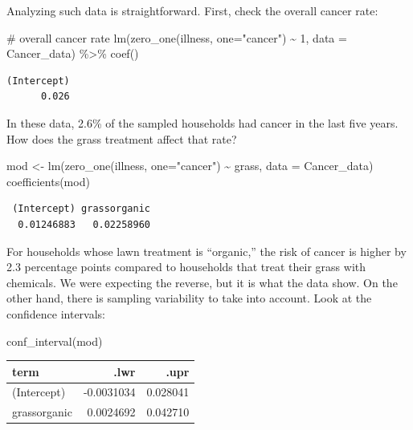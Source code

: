 \documentclass[
  letterpaper,
  DIV=11,
  numbers=noendperiod,
  oneside]{scrreprt}
\newenvironment{Shaded}{\begin{snugshade}}{\end{snugshade}}
\newcommand{\AttributeTok}[1]{\textcolor[rgb]{0.40,0.45,0.13}{#1}}
\newcommand{\CommentTok}[1]{\textcolor[rgb]{0.37,0.37,0.37}{#1}}
\newcommand{\DecValTok}[1]{\textcolor[rgb]{0.68,0.00,0.00}{#1}}
\newcommand{\FunctionTok}[1]{\textcolor[rgb]{0.28,0.35,0.67}{#1}}
\newcommand{\NormalTok}[1]{\textcolor[rgb]{0.00,0.23,0.31}{#1}}
\newcommand{\OtherTok}[1]{\textcolor[rgb]{0.00,0.23,0.31}{#1}}
\newcommand{\SpecialCharTok}[1]{\textcolor[rgb]{0.37,0.37,0.37}{#1}}
\newcommand{\StringTok}[1]{\textcolor[rgb]{0.13,0.47,0.30}{#1}}
\begin{document}
Analyzing such data is straightforward. First, check the overall cancer
rate:

\begin{Shaded}
\begin{Highlighting}[]
\CommentTok{\# overall cancer rate}
\FunctionTok{lm}\NormalTok{(}\FunctionTok{zero\_one}\NormalTok{(illness, }\AttributeTok{one=}\StringTok{"cancer"}\NormalTok{) }\SpecialCharTok{\textasciitilde{}} \DecValTok{1}\NormalTok{, }\AttributeTok{data =}\NormalTok{ Cancer\_data) }\SpecialCharTok{\%\textgreater{}\%} \FunctionTok{coef}\NormalTok{()}
\end{Highlighting}
\end{Shaded}

\begin{verbatim}
(Intercept) 
      0.026 
\end{verbatim}

In these data, 2.6\% of the sampled households had cancer in the last
five years. How does the grass treatment affect that rate?

\begin{Shaded}
\begin{Highlighting}[]
\NormalTok{mod }\OtherTok{\textless{}{-}} \FunctionTok{lm}\NormalTok{(}\FunctionTok{zero\_one}\NormalTok{(illness, }\AttributeTok{one=}\StringTok{"cancer"}\NormalTok{) }\SpecialCharTok{\textasciitilde{}}\NormalTok{ grass, }\AttributeTok{data =}\NormalTok{ Cancer\_data)}
\FunctionTok{coefficients}\NormalTok{(mod)}
\end{Highlighting}
\end{Shaded}

\begin{verbatim}
 (Intercept) grassorganic 
  0.01246883   0.02258960 
\end{verbatim}

For households whose lawn treatment is ``organic,'' the risk of cancer
is higher by 2.3 percentage points compared to households that treat
their grass with chemicals. We were expecting the reverse, but it is
what the data show. On the other hand, there is sampling variability to
take into account. Look at the confidence intervals:

\begin{Shaded}
\begin{Highlighting}[]
\FunctionTok{conf\_interval}\NormalTok{(mod)}
\end{Highlighting}
\end{Shaded}

\ttfamily 
\begin{tabular}{lrr}
\toprule
term & .lwr & .upr\\
\midrule
(Intercept) & -0.0031034 & 0.028041\\
grassorganic & 0.0024692 & 0.042710\\
\bottomrule
\end{tabular} \normalfont
\bigskip
\end{document}
